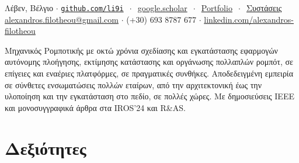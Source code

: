 \documentclass[a4paper,10pt,twoside]{article}
\begin{document}

\par{\bigskip\par}

\begin{center}
\vspace{-0.5em}
  {\small
   Λέβεν, Βέλγιο $\cdot$
  \href{https://github.com/li9i/}{\texttt{github.com/li9i}} $\ \cdot\ $ \href{https://scholar.google.com/citations?hl=en&view_op=list_works&gmla=AKzYXQ2ZNs_wAOy2e75F24-NJ0AGC7eeo8hugORYe3HG61yfKTR1H8vsWVf-C05DUq2qxvo9xqCvr6kF3qWTB4dIM-IJ&user=9_hI4hMAAAAJ}{google.scholar} $\ \cdot\ $ \href{https://docs.google.com/viewerng/viewer?url=https://raw.githubusercontent.com/li9i/portfolio/master/portfolio.pdf}{Portfolio} $\ \cdot \ $ \href{https://docs.google.com/viewerng/viewer?url=https://raw.githubusercontent.com/li9i/cv/master/references/references_alexandros_filotheou.pdf}{Συστάσεις} \\
  \href{mailto:alexandros.filotheou@gmail.com}{alexandros.filotheou@gmail.com} $\cdot$ (+30) 693 8787 677 $\cdot$ \href{https://www.linkedin.com/in/alexandros-filotheou/}{linkedin.com/alexandros-filotheou}
  }
\end{center}\vspace{-0.75em}

\begin{gg_box} \small
Μηχανικός Ρομποτικής με οκτώ χρόνια σχεδίασης και εγκατάστασης εφαρμογών αυτόνομης πλοήγησης, εκτίμησης κατάστασης και οργάνωσης πολλαπλών ρομπότ, σε επίγειες και εναέριες πλατφόρμες, σε πραγματικές συνθήκες. Αποδεδειγμένη εμπειρία σε σύνθετες ενσωματώσεις πολλών εταίρων, από την αρχιτεκτονική έως την υλοποίηση και την εγκατάσταση στο πεδίο, σε πολλές χώρες. Με δημοσιεύσεις IEEE και μονοσυγγραφικά άρθρα στα IROS'24 και R\&AS.
\end{gg_box}

\section{\textbf{Δεξιότητες}}\verticalspacebetweensectionandcontent\vspace{-0.75em}
\end{document}
